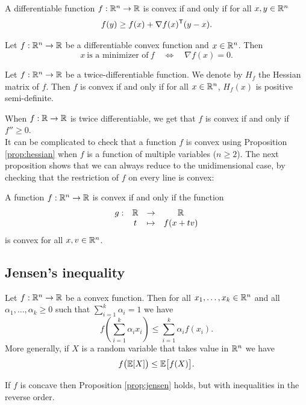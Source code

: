 \documentclass[11pt,nocut]{article}
\begin{document}
\begin{proposition}
	A differentiable function $f: \mathbb{R}^n \to \mathbb{R}$ is convex if and only if for all $x,y \in \mathbb{R}^n$
	$$
	f(y) \geq f(x) + \nabla f(x)^{{\sf T}} (y-x).
	$$
\end{proposition}

\begin{corollary}
	Let $f: \mathbb{R}^n \to \mathbb{R}$ be a differentiable convex function and $x \in \mathbb{R}^n$. Then
	$$
	x \ \text{is a minimizer of} \ f
	\quad \Longleftrightarrow \quad \nabla f(x) = 0.
	$$
\end{corollary}

\begin{proposition}\label{prop:hessian}
	Let $f: \mathbb{R}^n \to \mathbb{R}$ be a twice-differentiable function. We denote by $H_f$ the Hessian matrix of $f$.
	Then $f$ is convex if and only if for all $x \in \mathbb{R}^n$, $H_f(x)$ is positive semi-definite.
\end{proposition}
When $f: \mathbb{R} \to \mathbb{R}$ is twice differentiable, we get that $f$ is convex if and only if $f'' \geq 0$.
\\

It can be complicated to check that a function $f$ is convex using Proposition \ref{prop:hessian} when $f$ is a function of multiple variables ($n \geq 2$). The next proposition shows that we can always reduce to the unidimensional case, by checking that the restriction of $f$ on every line is convex:

\begin{proposition}
	A function $f: \mathbb{R}^n \to \mathbb{R}$ is convex if and only if the function
	$$
	\begin{array}{rccc}
		g: & \mathbb{R} & \to & \mathbb{R} \\
		   & t & \mapsto & f(x+t v)
	\end{array}
	$$
	is convex for all $x,v \in \mathbb{R}^n$.
\end{proposition}

\subsection{Jensen's inequality}

\begin{proposition}\label{prop:jensen}
	Let $f: \mathbb{R}^n \to \mathbb{R}$ be a convex function. Then for all $x_1, \dots, x_k \in \mathbb{R}^n$ and all $\alpha_1, \dots, \alpha_k \geq 0$ such that $\sum_{i=1}^k \alpha_i = 1$ we have
	$$
	f\left(\sum_{i=1}^k \alpha_i x_i \right) \leq \sum_{i=1}^k \alpha_i f(x_i).
	$$
	More generally, if $X$ is a random variable that takes value in $\mathbb{R}^n$ we have
	$$
	f\big(\mathbb{E} [X]\big) \leq \mathbb{E} \big[f(X)\big].
	$$
\end{proposition}
\begin{remark}
	If $f$ is concave then Proposition \ref{prop:jensen} holds, but with inequalities in the reverse order.
\end{remark}
\end{document}
